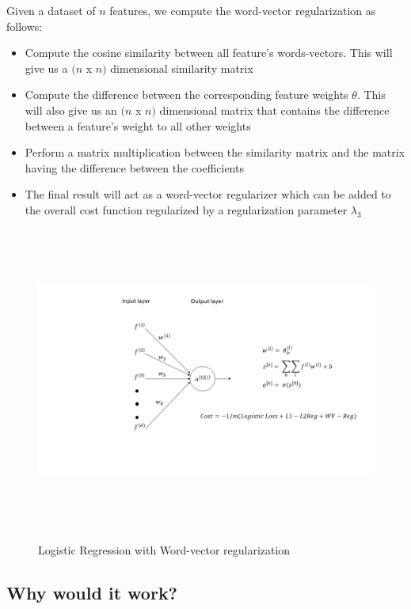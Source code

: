 \noindent Given a dataset of $n$ features, we compute the word-vector regularization as follows:

\begin{itemize}
\item Compute the cosine similarity between all feature's words-vectors. This will give us a $(n$ x $n)$ dimensional similarity matrix
\item Compute the difference between the corresponding feature weights $\theta$. This will also give us an $(n$ x $n)$ dimensional matrix that contains the difference between a feature's weight to all other weights
\item Perform a matrix multiplication between the similarity matrix and the matrix having the difference between the coefficients
\item The final result will act as a word-vector regularizer which can be added to the overall cost function regularized by a regularization parameter $\lambda_{3}$

\end{itemize}

\newpage

\begin{figure}[htbp]
\centering
\includegraphics[width=16cm, height=10cm]{images/model3.png}\\
\centering
\caption{Logistic Regression with Word-vector regularization}
\label{fig:foo}
\end{figure}

\subsection{Why would it work?}

